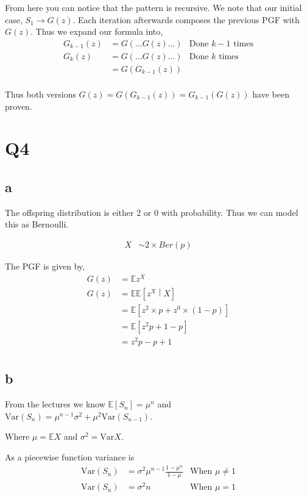 \documentclass{article}
\newcommand{\expect}{\mathbb{E}}
\newcommand{\var}{\text{Var}}
\begin{document}
From here you can notice that the pattern is recursive. We note that our
initial case, $S_1 \to G(z)$. Each iteration afterwards composes the
previous PGF with $G(z)$. Thus we expand our formula into,
\begin{align*}
    G_{k-1}(z) &= G(\ldots G(z) \ldots ) & \text{Done $k-1$ times} \\
    G_k(z) &= G(\ldots G(z) \ldots ) & \text{Done $k$ times} \\
    &= G(G_{k-1}(z)) \\
\end{align*}

Thus both versions $G(z) = G(G_{k-1}(z)) = G_{k-1}(G(z))$ have been proven.

\section{Q4}
\subsection{a}
The offspring distribution is either 2 or 0 with probability. Thus we can
model this as Bernoulli.

\begin{align*}
    X &\sim 2 \times Ber(p)
\end{align*}

The PGF is given by,
\begin{align*}
    G(z) &= \expect z^X \\
    G(z) &= \expect \expect \left[z^X \middle| X \right] \\
    &= \expect \left[z^2 \times p + z^0 \times (1-p)\right] \\
    &= \expect \left[z^2 p + 1 - p\right] \\
    &= z^2 p - p + 1 \\
\end{align*}

\subsection{b}
From the lectures we know $\expect[S_n] = \mu^n$ and
$\var(S_n) = \mu^{n-1} \sigma^2 + \mu^2 \var(S_{n-1})$.

Where $\mu = \expect X$ and $\sigma^2 = \var X$.

As a piecewise function variance is
\begin{align*}
    \var(S_n) &= \sigma^2 \mu^{n-1} \frac{1-\mu^n}{1-\mu}
    & \text{When $\mu \neq 1$} \\
    \var(S_n) &= \sigma^2 n
    & \text{When $\mu = 1$}
\end{align*}
\end{document}
